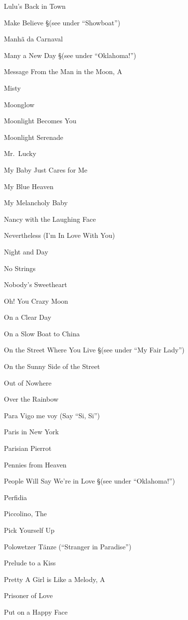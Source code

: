 \N Lulu's Back in Town

\N Make Believe
\nobreak
\S (see under ``Showboat'')

\N Manh{\~a} da Carnaval

\N Many a New Day
\nobreak
\S (see under ``Oklahoma!'')

\N Message From the Man in the Moon, A

\N Misty

\N Moonglow

\N Moonlight Becomes You

\N Moonlight Serenade

\N Mr.~Lucky

\N My Baby Just Cares for Me

\N My Blue Heaven

\N My Melancholy Baby

\N Nancy with the Laughing Face

\N Nevertheless (I'm In Love With You)

\N Night and Day

\N No Strings

\N Nobody's Sweetheart

\N Oh! You Crazy Moon

\N On a Clear Day

\N On a Slow Boat to China

\N On the Street Where You Live
\nobreak
\S (see under ``My Fair Lady'')

\N On the Sunny Side of the Street

\N Out of Nowhere

\N Over the Rainbow

\N Para Vigo me voy (Say ``Si, Si'')

\N Paris in New York

\N Parisian Pierrot

\N Pennies from Heaven

\N People Will Say We're in Love
\nobreak
\S (see under ``Oklahoma!'')

\N Perfidia

\N Piccolino, The

\N Pick Yourself Up

\N Polowetzer T{\"a}nze (``Stranger in Paradise'')

\N Prelude to a Kiss

\N Pretty A Girl is Like a Melody, A

\N Prisoner of Love

\N Put on a Happy Face

